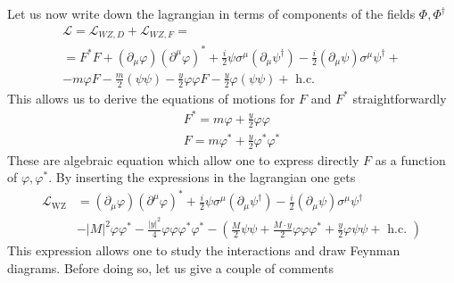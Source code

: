 \documentclass[12pt]{article}
\begin{document}
\vspace{15pt}

Let us now write down the lagrangian in terms of components of the fields $\Phi, \Phi^\dagger$
\begin{gather*}
  \mathcal{L} = \mathcal{L}_{WZ, D} + \mathcal{L}_{WZ, F} = \\ 
  = F^{*} F+\left(\partial_{\mu} \varphi\right)\left(\partial^{\mu} \varphi\right)^{*}+\frac{i}{2} \psi \sigma^{\mu}\left(\partial_{\mu} \psi^{\dagger}\right)-\frac{i}{2}\left(\partial_{\mu} \psi\right) \sigma^{\mu} \psi^{\dagger} + \\
      -m \varphi F-\frac{m}{2}(\psi \psi)-\frac{y}{2} \varphi \varphi F-\frac{y}{2} \varphi(\psi \psi)+\text { h.c. }
\end{gather*}
This allows us to derive the equations of motions for $F$ and $F^*$ straightforwardly 
\begin{gather*}
  F^{*} = m \varphi+\frac{y}{2} \varphi \varphi \\
  F = m\varphi^* + \frac{y}{2}\varphi^*\varphi^* 
\end{gather*}
These are algebraic equation which allow one to express directly $F$ as a function of $\varphi, \varphi^*$. By inserting the expressions in the lagrangian one gets 
\begin{equation}
  \begin{aligned}
      \mathcal{L}_{\mathrm{WZ}} &=\left(\partial_{\mu} \varphi\right)\left(\partial^{\mu} \varphi\right)^{*}+\frac{i}{2} \psi \sigma^{\mu}\left(\partial_{\mu} \psi^{\dagger}\right)-\frac{i}{2}\left(\partial_{\mu} \psi\right) \sigma^{\mu} \psi^{\dagger} \\
      &-|M|^{2} \varphi \varphi^{*}-\frac{|y|^{2}}{4} \varphi \varphi \varphi^{*} \varphi^{*}-\left(\frac{M}{2} \psi \psi+\frac{M \cdot y}{2} \varphi \varphi \varphi^{*}+\frac{y}{2} \varphi \psi \psi+\text { h.c. }\right)
      \end{aligned}
      \label{eq:lagrangian_components}
\end{equation}
This expression allows one to study the interactions and draw Feynman diagrams. Before doing so, let us give a couple of comments 
\end{document}
